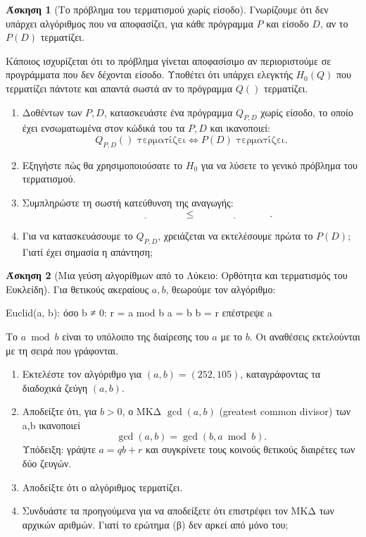 \documentclass[11pt,a4paper]{article}
\theoremstyle{definition}
\newtheorem{question}{Άσκηση}
\begin{document}
\begin{question}[Το πρόβλημα του τερματισμού χωρίς είσοδο]
Γνωρίζουμε ότι δεν υπάρχει αλγόριθμος που να αποφασίζει,
για κάθε πρόγραμμα $P$ και είσοδο $D$,
αν το $P(D)$ τερματίζει.

Κάποιος ισχυρίζεται ότι το πρόβλημα γίνεται αποφασίσιμο
αν περιοριστούμε σε προγράμματα που δεν δέχονται είσοδο.
Υποθέτει ότι υπάρχει ελεγκτής $H_0(Q)$ που τερματίζει
πάντοτε και απαντά σωστά αν το πρόγραμμα $Q()$ τερματίζει.

\begin{enumerate}
\item Δοθέντων των $P,D$, κατασκευάστε ένα πρόγραμμα
$Q_{P,D}$ χωρίς είσοδο, το οποίο έχει ενσωματωμένα
στον κώδικά του τα $P,D$ και ικανοποιεί:
\[
Q_{P,D}()\text{ τερματίζει}
\iff
P(D)\text{ τερματίζει}.
\]

\item Εξηγήστε πώς θα χρησιμοποιούσατε το $H_0$
για να λύσετε το γενικό πρόβλημα του τερματισμού.

\item Συμπληρώστε τη σωστή κατεύθυνση της αναγωγής:
\[
\underline{\hspace{3cm}}
\;\leq\;
\underline{\hspace{3cm}}.
\]

\item Για να κατασκευάσουμε το $Q_{P,D}$,
χρειάζεται να εκτελέσουμε πρώτα το $P(D)$;
Γιατί έχει σημασία η απάντηση;
\end{enumerate}
\end{question}



\begin{question}[Μια γεύση αλγορίθμων από το Λύκειο: Ορθότητα και τερματισμός του Ευκλείδη]
Για θετικούς ακεραίους $a,b$, θεωρούμε τον αλγόριθμο:
\begin{pseudocode}
Euclid(a, b):
    όσο b ≠ 0:
        r = a mod b
        a = b
        b = r
    επέστρεψε a
\end{pseudocode}
Το $a\bmod b$ είναι το υπόλοιπο της διαίρεσης του $a$
με το $b$. Οι αναθέσεις εκτελούνται με τη σειρά που γράφονται.

\begin{enumerate}
\item Εκτελέστε τον αλγόριθμο για $(a,b)=(252,105)$,
καταγράφοντας τα διαδοχικά ζεύγη $(a,b)$.

\item Αποδείξτε ότι, για $b>0$, ο ΜΚΔ $\gcd(a,b)$  (greatest common divisor) των a,b ικανοποιεί 
\[
\gcd(a,b)=\gcd(b,a\bmod b).
\]
Υπόδειξη: γράψτε $a=qb+r$ και συγκρίνετε
τους κοινούς θετικούς διαιρέτες των δύο ζευγών.

\item Αποδείξτε ότι ο αλγόριθμος τερματίζει.

\item Συνδυάστε τα προηγούμενα για να αποδείξετε ότι
επιστρέφει τον ΜΚΔ των αρχικών αριθμών.
Γιατί το ερώτημα (β) δεν αρκεί από μόνο του;
\end{enumerate}
\end{question}
\end{document}
